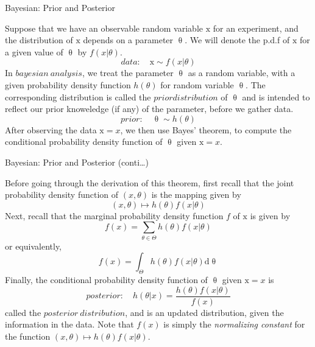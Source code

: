 \documentclass{bredelebeamer}
\begin{document}
\begin{frame}{Bayesian: Prior and Posterior}
  \begin{justify}
    Suppose that we have an observable random variable $\mathrm{x}$ for an
    experiment, and the distribution of $\mathrm{x}$ depends on a parameter
    $\uptheta$. We will denote the p.d.f of $\mathrm{x}$ for a given
    value of $\uptheta$ by $f(\mathit{x}|\theta)$.
    \begin{equation}
      data: \quad \mathrm{x} \sim f(\mathit{x}|\theta)
    \end{equation}
    In $\mathit{bayesian\ analysis}$, we treat the parameter $\uptheta$ as
    a random variable, with a given probability density function $h(\theta)$ for
    random variable $\uptheta$. The corresponding distribution is called
    the $\mathit{prior distribution}$ of $\uptheta$ and is intended to
    reflect our prior knoweledge (if any) of the parameter, before we gather data.
    \begin{equation}
      prior: \quad \uptheta \sim h(\theta)
    \end{equation}
    After observing the data $\mathrm{x}=\mathit{x}$, we then use Bayes' theorem,
    to compute the conditional probability density function of $\uptheta$
    given $\mathrm{x}=\mathit{x}$.
  \end{justify}
\end{frame}

\begin{frame}{Bayesian: Prior and Posterior (conti\ldots)}
  \begin{justify}
    Before going through the derivation of this
    theorem, first recall that the joint probability density function of $(\mathit{x},\theta)$
    is the mapping given by
    \begin{equation}
      (\mathit{x},\theta) \mapsto h(\theta) f(\mathit{x}|\theta)
    \end{equation}
    Next, recall that the marginal probability density function $f$ of $\mathrm{x}$
    is given by
    \begin{equation}
      f(\mathit{x}) = \sum_{\theta \in \Theta} h(\theta)f(\mathit{x}|\theta)
    \end{equation}
    or equivalently,
    \begin{equation}
      f(\mathit{x}) = \int_{\Theta} h(\theta)f(\mathit{x}|\theta) \mathrm{d}\uptheta
    \end{equation}
    Finally, the conditional probability density function of $\uptheta$
    given $\mathrm{x}=\mathit{x}$ is
    \begin{equation}
      posterior: \quad h(\theta|\mathit{x})=\frac{h(\theta)f(\mathit{x}|\theta)}{f(\mathit{x})}
    \end{equation}
    called the $\mathit{posterior\ distribution}$, and is an updated distribution,
    given the information in the data. Note that $f(\mathit{x})$ is simply the
    \textit{normalizing constant} for the function $(\mathit{x},\theta) \mapsto
    h(\theta) f(\mathit{x}|\theta)$.
  \end{justify}
\end{frame}
\end{document}
